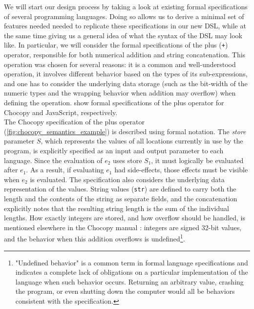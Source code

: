 We will start our design process by taking a look at existing formal specifications of several programming languages. Doing so allows us to derive a minimal set of features needed needed to replicate these specifications in our new \ac{DSL}, while at the same time giving us a general idea of what the syntax of the \ac{DSL} may look like. In particular, we will consider the formal specifications of the plus (\texttt{+}) operator, responsible for both numerical addition and string concatenation. This operation was chosen for several reasons: it is a common and well-understood operation, it involves different behavior based on the types of its sub-expressions, and one has to consider the underlying data storage (such as the bit-width of the numeric types and the wrapping behavior when addition may overflow) when defining the operation.  show formal specifications of the plus operator for Chocopy \cite{PhadyeSH19-SPLASHE} and JavaScript, respectively.\\

The Chocopy specification of the plus operator (\cref{fig:chocopy_semantics_example}) is described using formal notation. The \textit{store} parameter $S$, which represents the values of all locations currently in use by the program, is explicitly specified as an input and output parameter to each language. Since the evaluation of $e_2$ uses store $S_1$, it must logically be evaluated after $e_1$. As a result, if evaluating $e_1$ had side-effects, those effects must be visible when $e_2$ is evaluated. The specification also considers the underlying data representation of the values. String values (\texttt{str}) are defined to carry both the length and the contents of the string as separate fields, and the concatenation explicitly notes that the resulting string length is the sum of the individual lengths. How exactly integers are stored, and how overflow should be handled, is mentioned elsewhere in the Chocopy manual \cite{PadhyeSH19}: integers are signed 32-bit values, and the behavior when this addition overflows is undefined\footnote{"Undefined behavior" is a common term in formal language specifications and indicates a complete lack of obligations on a particular implementation of the language when such behavior occurs. Returning an arbitrary value, crashing the program, or even shutting down the computer would all be behaviors consistent with the specification.}.\\

